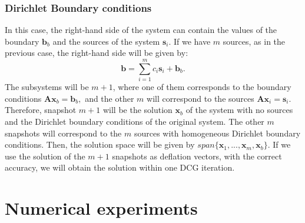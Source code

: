 \documentclass[12pt]{article}
\begin{document}
\subsubsection*{{Dirichlet Boundary conditions}}
In this case, the right-hand side of the system can contain the values of the boundary $\mathbf{b}_b$ and the sources of the system $\mathbf{s}_i$. 
If we have $m$ sources, as in the previous case, the right-hand side will be given by:
$$\mathbf{b}=\sum_{i=1}^{m} {c}_i\mathbf{s}_i+\mathbf{b}_b.$$
The subsystems will be $m+1$, where one of them corresponds to the boundary conditions
 $\mathbf{A}\mathbf{x}_b=\mathbf{b}_b,$
 and the other $m$ will correspond to the sources
$\mathbf{A}\mathbf{x}_i=\mathbf{s}_i.$
Therefore, snapshot $m+1$ will be the solution $\mathbf{x}_b$ of the system with no sources and the Dirichlet boundary conditions of the original system. The other $m$ snapshots will correspond to the $m$ sources with homogeneous Dirichlet boundary conditions. Then, the solution space will be given by $ span\{\mathbf{x}_1,...,\mathbf{x}_{m},\mathbf{x}_b\}$.
If we use the solution of the $m+1$ snapshots as deflation vectors, with the correct accuracy, we will obtain the solution within one DCG iteration.


\newpage
\section{Numerical experiments}\label{numexp}
\end{document}
